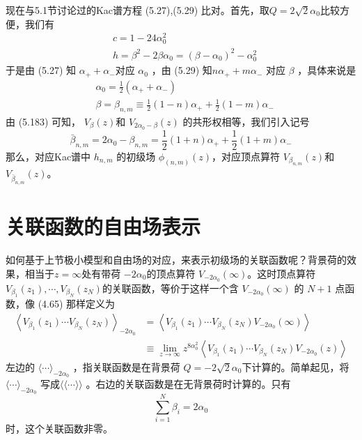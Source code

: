 现在与5.1节讨论过的Kac谱方程 (5.27),(5.29) 比对。首先，取$ Q=2 \sqrt{2} \alpha_{0} $比较方便，我们有
\begin{align} &c=1-24 \alpha_{0}^{2}\\ &h=\beta^{2}-2 \beta \alpha_{0}=\left(\beta-\alpha_{0}\right)^{2}-\alpha_{0}^{2} \end{align}
于是由 (5.27) 知 $\alpha_{+}+\alpha_{-} $对应 $\alpha_0$ ，由 (5.29) 知$ n \alpha_{+}+m \alpha_{-}$ 对应 $\beta$ ，具体来说是
\begin{align} &\alpha_{0}=\frac{1}{2}\left(\alpha_{+}+\alpha_{-}\right) \\ &\beta=\beta_{n, m} \equiv \frac{1}{2}(1-n) \alpha_{+}+\frac{1}{2}(1-m) \alpha_{-}\end{align}
由 (5.183) 可知， $V_{\beta}(z) $和 $V_{2 \alpha_{0}-\beta}(z)$ 的共形权相等，我们引入记号
\begin{equation}
	\bar{\beta}_{n, m}=2 \alpha_{0}-\beta_{n, m}=\frac{1}{2}(1+n) \alpha_{+}+\frac{1}{2}(1+m) \alpha_{-} 
\end{equation}
那么，对应Kac谱中 $h_{n,m}$ 的初级场 $\phi_{(n, m)}(z) $，对应顶点算符 $V_{\beta_{n, m}}(z) $和$ V_{\bar{\beta}_{n, m}}(z) $。

\section{关联函数的自由场表示}
如何基于上节极小模型和自由场的对应，来表示初级场的关联函数呢？背景荷的效果，相当于$ z=\infty $处有带荷 $-2\alpha_0 $的顶点算符 $V_{-2 \alpha_{0}}(\infty) $。这时顶点算符 $V_{\beta_{1}}\left(z_{1}\right), \cdots, V_{\beta_{N}}\left(z_{N}\right) $的关联函数，等价于这样一个含 $V_{-2 \alpha_{0}}(\infty)$ 的 $N+1$ 点函数，像 (4.65) 那样定义为
\begin{equation}
	\begin{aligned} \left\langle V_{\beta_{1}}\left(z_{1}\right) \cdots V_{\beta_{N}}\left(z_{N}\right)\right\rangle_{-2 \alpha_{0}} &=\left\langle V_{\beta_{1}}\left(z_{1}\right) \cdots V_{\beta_{N}}\left(z_{N}\right) V_{-2 \alpha_{0}}(\infty)\right\rangle \\ & \equiv \lim _{z \rightarrow \infty} z^{8 \alpha_{0}^{2}}\left\langle V_{\beta_{1}}\left(z_{1}\right) \cdots V_{\beta_{N}}\left(z_{N}\right) V_{-2 \alpha_{0}}(z)\right\rangle \end{aligned} 
\end{equation}
左边的 $\langle\cdots\rangle_{-2 \alpha_{0}}$ ，指关联函数是在背景荷 $Q=-2 \sqrt{2} \alpha_{0} $下计算的。简单起见，将$ \langle\cdots\rangle_{-2 \alpha_{0}}$ 写成$ \langle\langle\cdots\rangle\rangle$ 。右边的关联函数是在无背景荷时计算的。只有
\begin{equation}
	\sum_{i=1}^{N} \beta_{i}=2 \alpha_{0} 
\end{equation}
时，这个关联函数非零。

